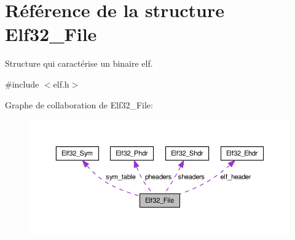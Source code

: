 \hypertarget{structElf32__File}{\section{Référence de la structure Elf32\-\_\-\-File}
\label{structElf32__File}
}


Structure qui caractérise un binaire elf.  




{\ttfamily \#include $<$elf.\-h$>$}



Graphe de collaboration de Elf32\-\_\-\-File\-:\nopagebreak
\begin{figure}[H]
\begin{center}
\leavevmode
\includegraphics[width=350pt]{structElf32__File__coll__graph}
\end{center}
\end{figure}
